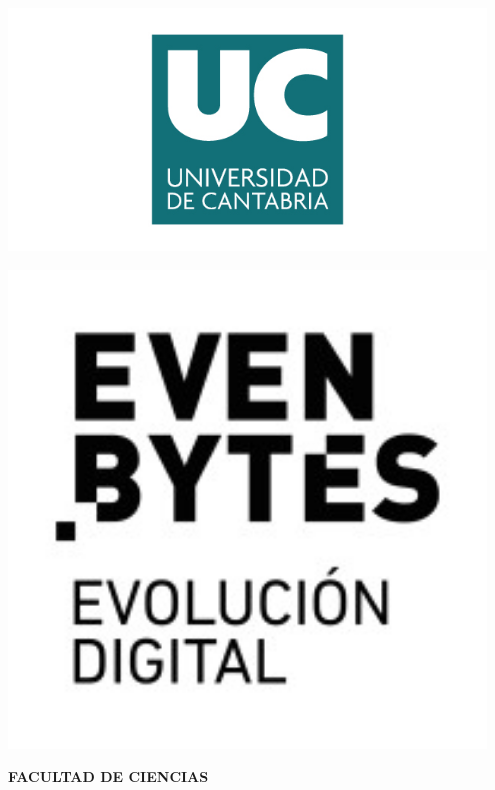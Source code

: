 \thispagestyle{empty}
\begin{titlepage}
\begin{center}

\begin{minipage}{0.6\textwidth}
\raggedright
\includegraphics[width=0.95\textwidth]{figuras/logo_UC.jpg}
\end{minipage}
\hfill
\begin{minipage}{0.32\textwidth}
\raggedleft
\includegraphics[width=0.95\textwidth]{figuras/logo_Evenbytes.png}
\end{minipage}

\vspace{2cm}

{\Large \textbf{FACULTAD DE CIENCIAS}}

\vspace{1cm}


\end{center}
\end{titlepage}
